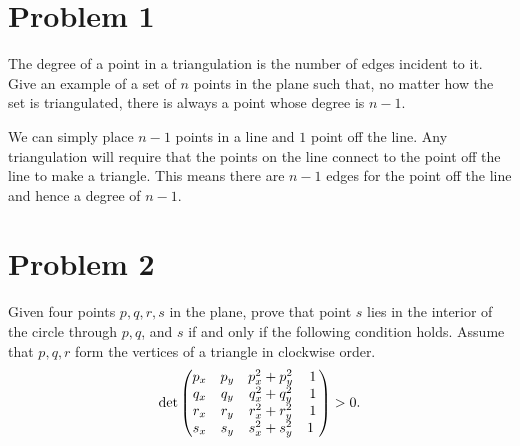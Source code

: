 \documentclass[12pt]{extarticle}
\begin{document}
\section*{Problem 1}
The degree of a point in a triangulation is the number of edges incident to it. Give an example of a set of $n$ points in the plane such that, no matter how the set is triangulated, there is always a point whose degree is $n-1$.

\begin{solution}
    We can simply place $n-1$ points in a line and $1$ point off the line. Any triangulation will require that the points on the line connect to the point off the line to make a triangle. This means there are $n-1$ edges for the point off the line and hence a degree of $n-1$.
\end{solution}

\section*{Problem 2}
Given four points $p, q, r, s$ in the plane, prove that point $s$ lies in the interior of the circle through $p, q$, and $s$ if and only if the following condition holds. Assume that $p, q, r$ form the vertices of a triangle in clockwise order.
\[
    \det\mqty(
        p_x & p_y &p_x^2 + p_y^2 & 1 \\
        q_x & q_y &q_x^2 + q_y^2 & 1 \\
        r_x & r_y &r_x^2 + r_y^2 & 1 \\
        s_x & s_y & s_x^2 + s_y^2 & 1\
    ) > 0
.\]
\end{document}
